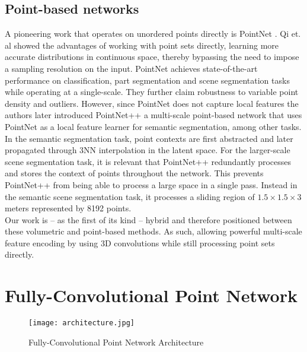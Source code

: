 \documentclass[runningheads]{llncs}
\begin{document}
\subsection{Point-based networks}
\label{section:point-networks}

A pioneering work that operates on unordered points directly is PointNet \cite{Qi2017}. Qi et. al showed the advantages of working with point sets directly, learning more accurate distributions in continuous space, thereby bypassing the need to impose a sampling resolution on the input. PointNet achieves state-of-the-art performance on classification, part segmentation and scene segmentation tasks while operating at a single-scale. They further claim robustness to variable point density and outliers. However, since PointNet does not capture local features the authors later introduced PointNet++ \cite{Qi2017_2} 
a multi-scale point-based network that uses PointNet as a local feature learner for semantic segmentation, among other tasks. In the semantic segmentation task, point contexts are first abstracted and later propagated through 3NN interpolation in the latent space. For the larger-scale scene segmentation task, it is relevant that PointNet++ redundantly processes and stores the context of points throughout the network. This prevents PointNet++ from being able to process a large space in a single pass. Instead in the semantic scene segmentation task, it processes a sliding region of $1.5 \times 1.5 \times 3$ meters represented by 8192 points.\\ 

Our work is -- as the first of its kind -- hybrid and therefore positioned between these volumetric and point-based methods.
As such, allowing powerful multi-scale feature encoding by using 3D convolutions while still processing point sets directly.



\section{Fully-Convolutional Point Network}

\begin{figure}[h]
    \centering
 \texttt{[image: architecture.jpg]} 
    \caption{Fully-Convolutional Point Network Architecture}
    \label{fig:architecture} 
\end{figure}
\end{document}

